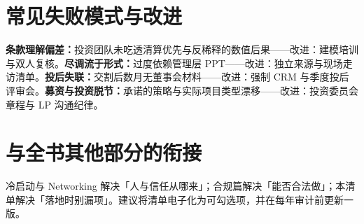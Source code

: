 \section{常见失败模式与改进}

\textbf{条款理解偏差：}投资团队未吃透清算优先与反稀释的数值后果——改进：建模培训与双人复核。\textbf{尽调流于形式：}过度依赖管理层 PPT——改进：独立来源与现场走访清单。\textbf{投后失联：}交割后数月无董事会材料——改进：强制 CRM 与季度投后评审会。\textbf{募资与投资脱节：}承诺的策略与实际项目类型漂移——改进：投资委员会章程与 LP 沟通纪律。

\section{与全书其他部分的衔接}

冷启动与 Networking 解决「人与信任从哪来」；合规篇解决「能否合法做」；本清单解决「落地时别漏项」。建议将清单电子化为可勾选项，并在每年审计前更新一版。
